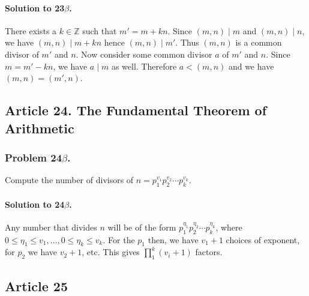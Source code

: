\paragraph*{Solution to 23$\beta$.}
There exists a $ k \in \mathbb{Z} $ such that $m' = m + kn$. Since $ (m,n) \mid
m $ and $ (m,n) \mid n$, we have $(m,n) \mid m + kn$ hence $(m,n) \mid m'$.
Thus $(m,n)$ is a common divisor of $m'$ and $n$. Now consider some common
divisor $a$ of $m'$ and $n$. Since $m = m' - kn$, we have $a \mid m $ as well.
Therefore $ a < (m,n) $ and we have $ (m,n) = (m',n) $.

\subsection{Article 24. The Fundamental Theorem of Arithmetic}
\subsubsection{Problem 24$\beta$.}
Compute the number of divisors of $ n = p_1^{v_1} p_2^{v_2} \cdots p_k^{v_k} $.

\paragraph*{Solution to 24$\beta$.}
Any number that divides $ n $ will be of the form $ p_1^{\eta_1} p_2^{\eta_2}
\cdots p_k^{\eta_k} $, where $ 0 \leq \eta_1 \leq v_1, \dots, 0 \leq \eta_k \leq v_k $.
For the $ p_1 $ then, we have $ v_1 + 1 $ choices of exponent, for $ p_2 $ we have
$ v_2 + 1 $, etc. This gives $ \prod_1^k (v_i + 1) $ factors.

\subsection{Article 25}


